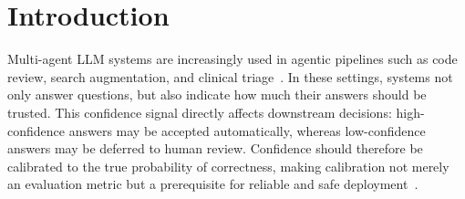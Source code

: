 \section{Introduction}
\label{sec:intro}

Multi-agent LLM systems are increasingly used in agentic pipelines such as code review, search augmentation, and clinical triage~\citep{du2023improvingfactualityreasoninglanguage,hong2024metagptmetaprogrammingmultiagent,wu2023autogenenablingnextgenllm}. 
In these settings, systems not only answer questions, but also indicate how much their answers should be trusted. This confidence signal directly affects downstream decisions: high-confidence answers may be accepted automatically, whereas low-confidence answers may be deferred to human review. Confidence should therefore be calibrated to the true probability of correctness, making calibration not merely an evaluation metric but a prerequisite for reliable and safe deployment~\citep{guo2017calibration,geifman2017selective}.

